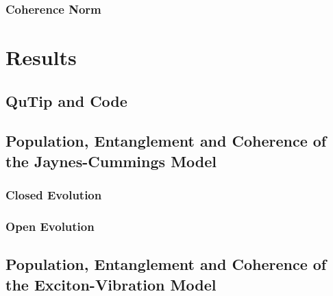 \documentclass[12pt]{article}
\begin{document}
\subsubsection{Coherence Norm}


























































\section{Results}
\subsection{QuTip and Code}
\subsection{Population, Entanglement and Coherence of the Jaynes-Cummings Model}
\subsubsection{Closed Evolution}
\subsubsection{Open Evolution}
\subsection{Population, Entanglement and Coherence of the Exciton-Vibration Model}
\end{document}
